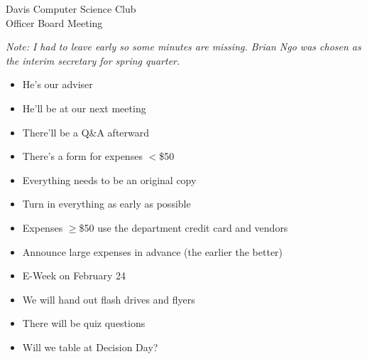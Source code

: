 \documentclass{article}
\begin{document}
\begin{Minutes}{Davis Computer Science Club\\Officer Board Meeting}
\missingExcused{}




\maketitle
\textit{Note: I had to leave early so some minutes are missing.  Brian Ngo was
  chosen as the interim secretary for spring quarter.}

\begin{itemize}
\item He's our adviser
\item He'll be at our next meeting
\item There'll be a Q\&A afterward
\end{itemize}

\begin{itemize}
\item There's a form for expenses $<$\$50
\item Everything needs to be an original copy
\item Turn in everything as early as possible
\item Expenses $\ge$\$50 use the department credit card and vendors
\item Announce large expenses in advance (the earlier the better)
\end{itemize}

\begin{itemize}
\item E-Week on February 24
\item We will hand out flash drives and flyers
\item There will be quiz questions
\item Will we table at Decision Day?
\end{itemize}


\end{Minutes}
\end{document}
